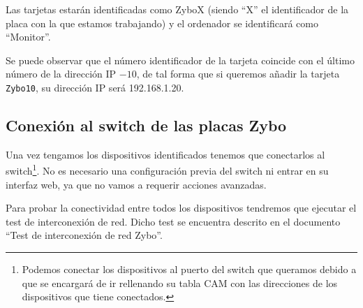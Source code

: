 \documentclass[12pt,letterpaper]{article}
\begin{document}
Las tarjetas estarán identificadas como ZyboX (siendo ``X'' el identificador de la placa con la que estamos trabajando) y el ordenador se identificará como ``Monitor''.

Se puede observar que el número identificador de la tarjeta coincide con el último número de la dirección IP $- 10$, de tal forma que si queremos añadir la tarjeta \texttt{Zybo10}, su dirección IP será 192.168.1.20.

\subsection{Conexión al switch de las placas Zybo}
Una vez tengamos los dispositivos identificados tenemos que conectarlos al switch\footnote{Podemos conectar los dispositivos al puerto del switch que queramos debido a que se encargará de ir rellenando su tabla CAM con las direcciones de los dispositivos que tiene conectados.}. No es necesario una configuración previa del switch ni entrar en su interfaz web, ya que no vamos a requerir acciones avanzadas.

Para probar la conectividad entre todos los dispositivos tendremos que ejecutar el test de interconexión de red. Dicho test se encuentra descrito en el documento ``Test de interconexión de red Zybo''.
\end{document}
